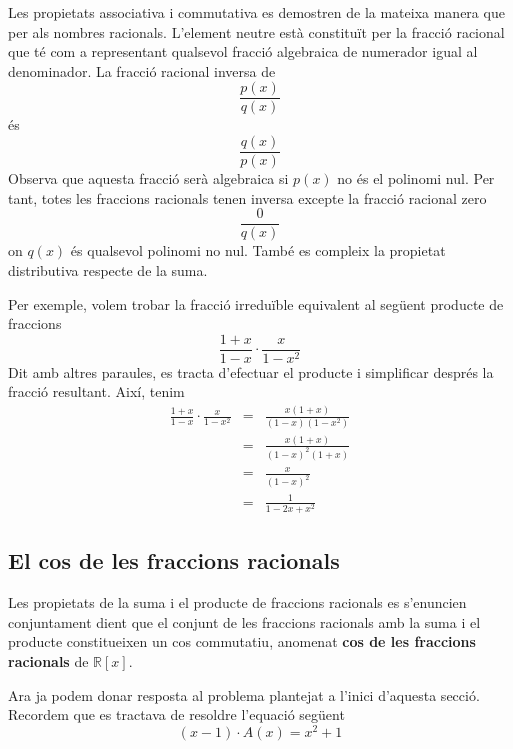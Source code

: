 Les propietats associativa i commutativa es demostren de la mateixa manera que
per als nombres racionals. L'element neutre està constituït per
la fracció racional que té com a representant qualsevol fracció
algebraica de numerador igual al denominador. La fracció racional
inversa de
\begin{equation*}
\frac{p(x)}{q(x)}
\end{equation*}és\begin{equation*}
\frac{q(x)}{p(x)}
\end{equation*}Observa que aquesta fracció serà algebraica si $p(x)$ no és el
polinomi nul. Per tant, totes les fraccions racionals tenen inversa excepte
la fracció racional zero\begin{equation*}
\frac{0}{q(x)}
\end{equation*}on $q(x)$ és qualsevol polinomi no nul. També es compleix la
propietat distributiva respecte de la suma.

Per exemple, volem trobar la fracció irreduïble equivalent al
següent producte de fraccions\begin{equation*}
\frac{1+x}{1-x}\cdot \frac{x}{1-x^{2}}
\end{equation*}Dit amb altres paraules, es tracta d'efectuar el producte i simplificar després la fracció resultant. Així, tenim\begin{eqnarray*}
\frac{1+x}{1-x}\cdot \frac{x}{1-x^{2}} &=&\frac{x(1+x)}{(1-x)(1-x^{2})} \\
&=&\frac{x(1+x)}{(1-x)^{2}(1+x)} \\
&=&\frac{x}{(1-x)^{2}} \\
&=&\frac{1}{1-2x+x^{2}}
\end{eqnarray*}

\subsection{El cos de les fraccions racionals}

Les propietats de la suma i el producte de fraccions racionals es
s'enuncien conjuntament dient que el conjunt de les fraccions racionals
amb la suma i el producte constitueixen un cos commutatiu, anomenat
\textbf{cos de les fraccions racionals} de $\mathbb{R}[x]$.

Ara ja podem donar resposta al problema plantejat a l'inici d'aquesta secció. Recordem que es tractava de resoldre l'equació següent\begin{equation*}
(x-1)\cdot A(x)=x^{2}+1
\end{equation*}

